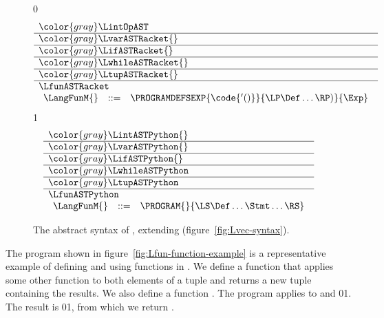 \documentclass[7x10]{TimesAPriori_MIT}%
\newcommand{\gray}[1]{{\color{gray} #1}}
\def\racketEd{0}
\def\pythonEd{1}
\def\edition{1}
\newcommand{\racket}[1]{{\if\edition\racketEd{#1}\fi}}
\newcommand{\pythonColor}[0]{}
\newcommand{\python}[1]{{\if\edition\pythonEd\pythonColor #1\fi}}
\numberwithin{theorem}{chapter}
\numberwithin{definition}{chapter}
\numberwithin{equation}{chapter}
\begin{document}
\begin{figure}[tp]
\centering
\begin{tcolorbox}[colback=white]
    \small
{\if\edition\racketEd
\[
\begin{array}{l}
  \gray{\LintOpAST} \\ \hline
  \gray{\LvarASTRacket{}} \\ \hline
  \gray{\LifASTRacket{}} \\ \hline
  \gray{\LwhileASTRacket{}} \\ \hline
  \gray{\LtupASTRacket{}} \\ \hline
  \LfunASTRacket \\
  \begin{array}{lcl}
  \LangFunM{} &::=& \PROGRAMDEFSEXP{\code{'()}}{\LP\Def\ldots\RP)}{\Exp}
  \end{array}
\end{array}
\]
\fi}
{\if\edition\pythonEd\pythonColor
\[
\begin{array}{l}
  \gray{\LintASTPython{}} \\ \hline
  \gray{\LvarASTPython{}} \\ \hline
  \gray{\LifASTPython{}} \\ \hline
  \gray{\LwhileASTPython} \\ \hline
  \gray{\LtupASTPython} \\  \hline
  \LfunASTPython \\
\begin{array}{rcl}
  \LangFunM{} &::=& \PROGRAM{}{\LS \Def \ldots \Stmt \ldots \RS}
\end{array}
\end{array}
\]
\fi}
\end{tcolorbox}

\caption{The abstract syntax of \LangFun{}, extending \LangVec{} (figure~\ref{fig:Lvec-syntax}).}
\label{fig:Lfun-syntax}
\end{figure}


The program shown in figure~\ref{fig:Lfun-function-example} is a
representative example of defining and using functions in \LangFun{}.
We define a function  that applies some other function
 to both elements of a tuple and returns a new tuple
containing the results. We also define a function .  The
program applies  to  and
%
\racket{}\python{}.
%
The result is \racket{}\python{},
%
from which we return .
\end{document}
